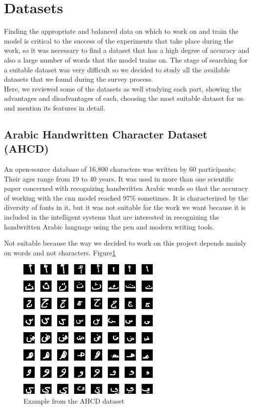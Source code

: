 \section{Datasets}
Finding the appropriate and balanced data on which to work on and train the model is critical to the success of the experiments that take place during the work, so it was necessary to find a dataset that has a high degree of accuracy and also a large number of words that the model trains on. The stage of searching for a suitable dataset was very difficult so we decided to study all the available datasets that we found during the survey process. \\

Here, we reviewed some of the datasets as well studying each part, showing the advantages and disadvantages of each, choosing the most suitable dataset for us and mention its features in detail.

\subsection{Arabic Handwritten Character Dataset (AHCD)}
An open-source database of 16,800 characters was written by 60 participants; Their ages range from 19 to 40 years. It was used in more than one scientific paper concerned with recognizing handwritten Arabic words so that the accuracy of working with the \acrshort{cnn} model reached 97\% sometimes.\cite{altwaijry2021arabic} It is characterized by the diversity of fonts in it, but it was not suitable for the work we want because it is included in the intelligent systems that are interested in recognizing the handwritten Arabic language using the pen and modern writing tools. 

Not suitable because the way we decided to work on this project depends mainly on words and not characters. Figure\ref{fig:AHCD sample}

\begin{figure}[!htb]
    \centering
    \includegraphics[width=7cm]{images/AHCD sample.png}
    \caption{Example from the AHCD dataset}
    \label{fig:AHCD sample}
\end{figure}

